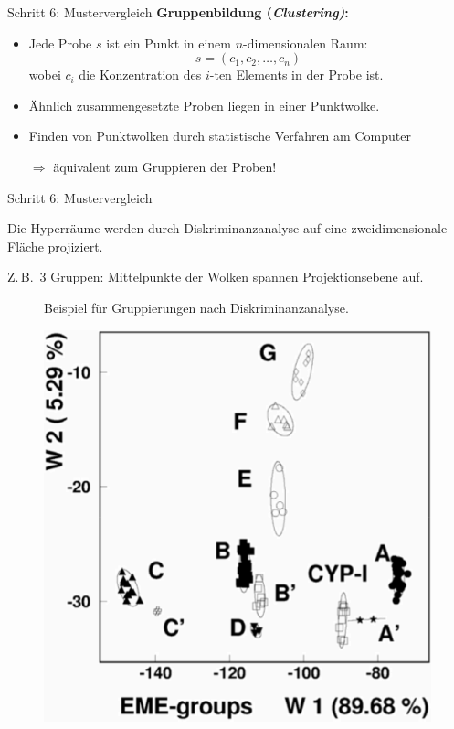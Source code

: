 \documentclass[xcolor=x11names, aspectratio=169]{beamer}
\begin{document}
\begin{frame}{Schritt 6: Mustervergleich}
\textbf{Gruppenbildung (\textit{Clustering)}:}
\begin{itemize}
\item Jede Probe $s$ ist ein \alert{Punkt} in einem $n$-dimensionalen Raum: \[s=(c_1,c_2,\dots,c_n)\] wobei $c_i$ die Konzentration des $i$-ten Elements in der Probe ist.\pause
\item Ähnlich zusammengesetzte Proben liegen in einer \alert{Punktwolke}.
\item Finden von Punktwolken durch statistische Verfahren am Computer

\alert{$\Rightarrow$ äquivalent zum Gruppieren der Proben!}
\end{itemize}
\end{frame}

\begin{frame}{Schritt 6: Mustervergleich}
\begin{minipage}{0.46\textwidth}\flushleft
Die Hyperräume werden durch \alert{Diskriminanzanalyse} auf eine zweidimensionale Fläche projiziert.\medskip	

Z.\,B.\ 3 Gruppen: Mittelpunkte der Wolken spannen Projektionsebene auf.\bigskip

\begin{figure}
\caption{Beispiel für Gruppierungen nach Diskriminanzanalyse.}
\end{figure}
\end{minipage}\hfill
\begin{minipage}{0.5\textwidth}
\begin{figure}
\includegraphics[width=.8\textwidth]{img/groups.png}
\end{figure}
\end{minipage}
\end{frame}
\end{document}

